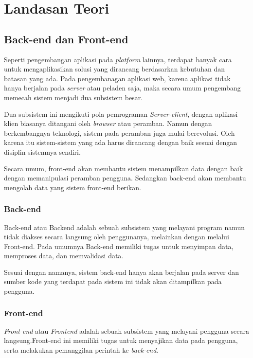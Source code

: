 \chapter{Landasan Teori}
\label{chap:teori}

\section{Back-end dan Front-end}
    Seperti pengembangan aplikasi pada \textit{platform} lainnya, terdapat
    banyak cara untuk mengaplikasikan solusi yang dirancang berdasarkan
    kebutuhan dan batasan yang ada. Pada pengembanagan aplikasi web, karena 
    aplikasi tidak hanya berjalan pada \textit{server} atau peladen saja, 
    maka secara umum pengembang memecah sistem menjadi dua subsistem besar.
    
    Dua subsistem ini mengikuti pola pemrograman \textit{Server-client},
    dengan aplikasi klien biasanya ditangani oleh \textit{browser} atau peramban. 
    Namun dengan berkembangnya teknologi, sistem pada peramban juga mulai berevolusi.
    Oleh karena itu sistem-sistem yang ada harus dirancang dengan baik
    sesuai dengan disiplin sistemnya sendiri.
    
    Secara umum, front-end akan membantu sistem menampilkan data dengan baik 
    dengan memanipulasi peramban pengguna. Sedangkan back-end akan membantu mengolah
    data yang sistem front-end berikan.

\subsection{Back-end}
    Back-end atau Backend adalah sebuah subsistem yang melayani program
    namun tidak diakses secara langsung oleh penggunanya, melainkan dengan
    melalui Front-end\cite{oxford:definition-backend}. Pada umumnya Back-end
    memiliki tugas untuk menyimpan data, memproses data, dan memvalidasi
    data.
    
    Sesuai dengan namanya, sistem back-end hanya akan berjalan pada server dan sumber
    kode yang terdapat pada sistem ini tidak akan ditampilkan pada pengguna.

\subsection{Front-end}
    \textit{Front-end} atau \textit{Frontend} adalah sebuah subsistem yang
    melayani pengguna secara langsung\cite{oxford:definition-frontend}.Front-end
    ini memiliki tugas untuk menyajikan data pada pengguna, serta melakukan
    pemanggilan perintah ke \textit{back-end}.
    

